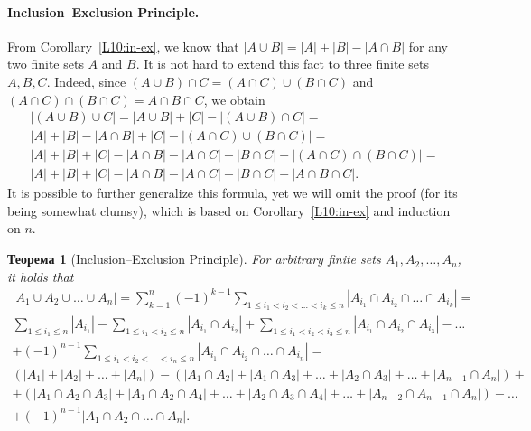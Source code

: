\documentclass[12pt,notitlepage]{article}
\theoremstyle{plain}
\newtheorem{thm}{Теорема}[section]
\theoremstyle{definition}
\theoremstyle{plain}
\newcommand{\1}{\mathbf{1}}
\newcommand{\0}{\mathbf{0}}
\begin{document}
\paragraph{Inclusion--Exclusion Principle.} From Corollary~\ref{L10:in-ex}, we know that $|A \cup B| = |A| + |B| - |A \cap B|$ for any two finite sets $A$ and $B$. It is not hard to extend this fact to three finite sets $A, B, C$. Indeed, since $(A \cup B) \cap C = (A \cap C) \cup (B \cap C)$ and $(A \cap C) \cap (B \cap C) = A \cap B \cap C$, we obtain
\begin{multline*}
	|(A \cup B) \cup C| = |A \cup B| + |C| - |(A \cup B) \cap C| =\\
	|A| + |B| - |A \cap B| + |C| - |(A \cap C) \cup (B \cap C)| =\\
	|A| + |B| + |C| - |A \cap B| - |A \cap C| - |B \cap C| + |(A \cap C) \cap (B \cap C)| =\\
	|A| + |B| + |C| - |A \cap B| - |A \cap C| - |B \cap C| + |A \cap B \cap C|.
\end{multline*}
It is possible to further generalize this formula, yet we will omit the proof (for its being somewhat clumsy), which is based on Corollary~\ref{L10:in-ex} and induction on $n$.
\begin{thm}[Inclusion--Exclusion Principle]\label{comb2:ex-in-gen}
	For arbitrary finite sets $A_1, A_2, \ldots, A_n$, it holds that
	\begin{multline*}
		|A_1 \cup A_2 \cup \ldots \cup A_n| = \sum\limits_{k = 1}^n (-1)^{k - 1} \sum\limits_{1\leqslant i_1 < i_2 < \ldots < i_k \leqslant n} |A_{i_1} \cap A_{i_2} \cap \ldots \cap A_{i_k}| =\\
		\sum\limits_{1\leqslant i_1 \leqslant n} |A_{i_1}| - \sum\limits_{1\leqslant i_1 < i_2 \leqslant n} |A_{i_1} \cap A_{i_2}| + \sum\limits_{1\leqslant i_1 < i_2 < i_3 \leqslant n} |A_{i_1} \cap A_{i_2} \cap A_{i_3}| - \ldots\\
		+ (-1)^{n - 1} \sum\limits_{1\leqslant i_1 < i_2 < \ldots < i_n \leqslant n} |A_{i_1} \cap A_{i_2} \cap \ldots \cap A_{i_n}|= \\[3pt]
		(|A_1| + |A_2| + \ldots + |A_n|) - (|A_1 \cap A_2| + |A_1 \cap A_3| +  \ldots + |A_2 \cap A_3| + \ldots + |A_{n -1} \cap A_n|) +\\[3pt]
		+ (|A_1 \cap A_2 \cap A_3| + |A_1 \cap A_2 \cap A_4| +  \ldots + |A_2 \cap A_3 \cap A_4| + \ldots + |A_{n -2} \cap A_{n -1} \cap A_n|) - \ldots\\[3pt]
		+ (-1)^{n - 1} |A_1 \cap A_2 \cap \ldots \cap A_n|.\\
	\end{multline*}
\end{thm}
\end{document}
